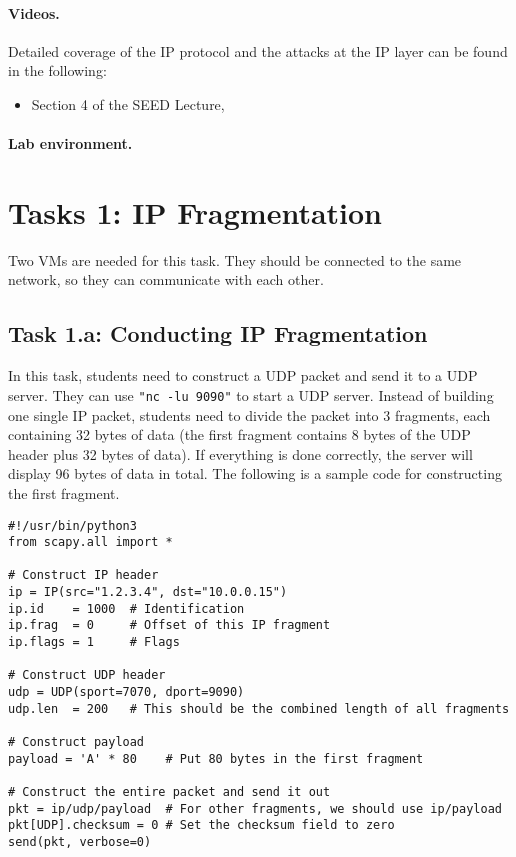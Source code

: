 \paragraph{Videos.}
Detailed coverage of the IP protocol and the attacks at the IP layer can be found 
in the following:

\begin{itemize}
\item Section 4 of the SEED Lecture, \seedisvideo
\end{itemize}


\paragraph{Lab environment.} \seedenvironmentB


\section{Tasks 1: IP Fragmentation}

Two VMs are needed for this task. They should be connected to the same network, so they
can communicate with each other.

\subsection{Task 1.a: Conducting IP Fragmentation}

In this task, students need to construct a UDP packet and send it to a UDP 
server. They can use \texttt{"nc -lu 9090"} to start a UDP server. 
Instead of building one single IP packet, students need to 
divide the packet into 3 fragments, each containing 32 bytes of data (the
first fragment contains 8 bytes of the UDP header plus 32 bytes of data).
If everything is done correctly, the server will display
96 bytes of data in total.  
The following is a sample code for constructing the first fragment.

\begin{lstlisting}
#!/usr/bin/python3
from scapy.all import *

# Construct IP header
ip = IP(src="1.2.3.4", dst="10.0.0.15")
ip.id    = 1000  # Identification
ip.frag  = 0     # Offset of this IP fragment
ip.flags = 1     # Flags

# Construct UDP header
udp = UDP(sport=7070, dport=9090)
udp.len  = 200   # This should be the combined length of all fragments

# Construct payload
payload = 'A' * 80    # Put 80 bytes in the first fragment

# Construct the entire packet and send it out
pkt = ip/udp/payload  # For other fragments, we should use ip/payload
pkt[UDP].checksum = 0 # Set the checksum field to zero
send(pkt, verbose=0)
\end{lstlisting}


